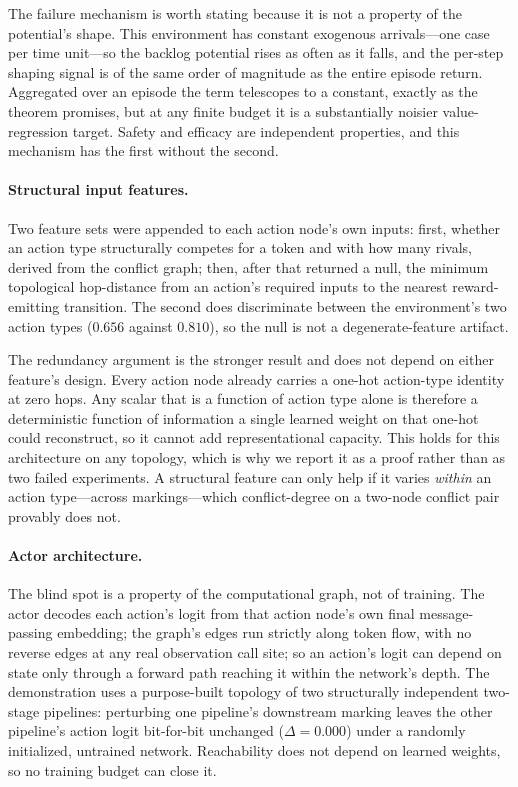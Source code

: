 \documentclass[review,authoryear,3p,times]{elsarticle}
\begin{document}
The failure mechanism is worth stating because it is not a property of the
potential's shape. This environment has constant exogenous arrivals---one case
per time unit---so the backlog potential rises as often as it falls, and the
per-step shaping signal is of the same order of magnitude as the entire episode
return. Aggregated over an episode the term telescopes to a constant, exactly as
the theorem promises, but at any finite budget it is a substantially noisier
value-regression target. Safety and efficacy are independent properties, and
this mechanism has the first without the second.

\paragraph{Structural input features.} Two feature sets were appended to each
action node's own inputs: first, whether an action type structurally competes
for a token and with how many rivals, derived from the conflict graph; then,
after that returned a null, the minimum topological hop-distance from an
action's required inputs to the nearest reward-emitting transition. The second
does discriminate between the environment's two action types ($0.656$ against
$0.810$), so the null is not a degenerate-feature artifact.

The redundancy argument is the stronger result and does not depend on either
feature's design. Every action node already carries a one-hot action-type
identity at zero hops. Any scalar that is a function of action type alone is
therefore a deterministic function of information a single learned weight on
that one-hot could reconstruct, so it cannot add representational capacity. This
holds for this architecture on any topology, which is why we report it as a
proof rather than as two failed experiments. A structural feature can only help
if it varies \emph{within} an action type---across markings---which
conflict-degree on a two-node conflict pair provably does not.

\paragraph{Actor architecture.} The blind spot is a property of the
computational graph, not of training. The actor decodes each action's logit from
that action node's own final message-passing embedding; the graph's edges run
strictly along token flow, with no reverse edges at any real observation call
site; so an action's logit can depend on state only through a forward path
reaching it within the network's depth. The demonstration uses a purpose-built
topology of two structurally independent two-stage pipelines: perturbing one
pipeline's downstream marking leaves the other pipeline's action logit
bit-for-bit unchanged ($\Delta=0.000$) under a randomly initialized, untrained
network. Reachability does not depend on learned weights, so no training budget
can close it.
\end{document}
